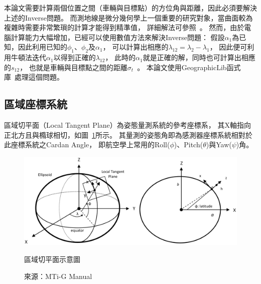 本論文需要計算兩個位置之間（車輛與目標點）的方位角與距離，因此必須要解決上述的Inverse問題。
而測地線是微分幾何學上一個重要的研究對象，當曲面較為複雜時需要非常繁瑣的計算才能得到精準值，
詳細解法可參照~\cite{Karney:2013:Algorithms_for_Geodesics,Jekeli:2006:GRSinGeodesy}。
然而，由於電腦計算能力大幅增加，已經可以使用數值方法來解決Inverse問題：
假設$\alpha_1$為已知，因此利用已知的$\phi_1$、$\phi_2$及$\alpha_1$，
可以計算出相應的$\lambda_{12} = \lambda_2 - \lambda_1$，
因此便可利用牛頓法迭代$\alpha_1$以得到正確的$\lambda_{12}$，
此時的$\alpha_1$就是正確的解，同時也可計算出相應的$s_{12}$，
也就是車輛與目標點之間的距離$\sigma_t$~\cite{Karney:2013:Algorithms_for_Geodesics}。
本論文使用GeographicLib函式庫~\cite{website:GeographicLib}處理這個問題。

\subsection{區域座標系統}
區域切平面（Local Tangent Plane）為姿態量測系統的參考座標系，
其X軸指向正北方且與橢球相切，如圖~\ref{f:LTP}所示。
其量測的姿態角即為感測器座標系統相對於此座標系統之Cardan Angle，
即航空學上常用的Roll($\phi$)、Pitch($\theta$)與Yaw($\psi$)角。
\begin{figure}[h!]
	\centering
	\includegraphics[width=\textwidth]{figures/algorithm/LTP}
	\caption{區域切平面示意圖}
	\caption*{來源：MTi-G Manual}
	\label{f:LTP}
\end{figure}

